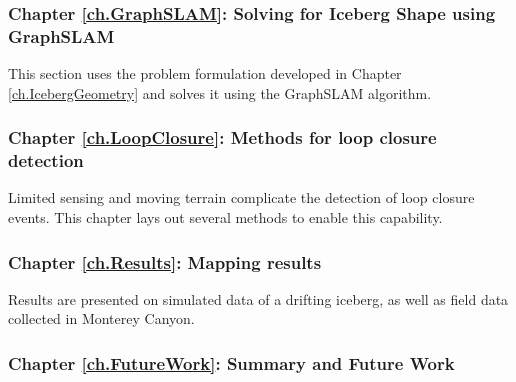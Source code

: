 \subsubsection*{Chapter \ref{ch.GraphSLAM}: Solving for Iceberg Shape using GraphSLAM} This section uses the problem formulation developed in Chapter \ref{ch.IcebergGeometry} and solves it using the GraphSLAM algorithm.

\subsubsection*{Chapter \ref{ch.LoopClosure}: Methods for loop closure detection} Limited sensing and moving terrain complicate the detection of loop closure events. This chapter lays out several methods to enable this capability.

\subsubsection*{Chapter \ref{ch.Results}: Mapping results} Results are presented on simulated data of a drifting iceberg, as well as field data collected in Monterey Canyon. 

\subsubsection*{Chapter \ref{ch.FutureWork}: Summary and Future Work}

